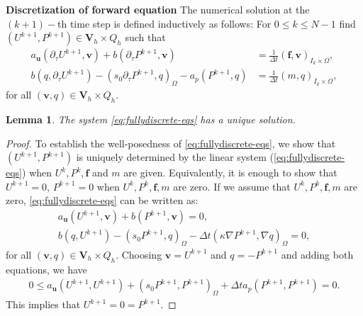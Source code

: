 \documentclass{amsart}
\newcommand{\ta}{\tau}
\newtheorem{lemma}[theorem]{Lemma}
\newcommand{\algn}[1]{\begin{align} #1 \end{align}}
\newcommand{\algns}[1]{\begin{align*} #1 \end{align*}}
\newcommand{\LRp}[1]{\left( #1 \right)}
\begin{document}
\medskip
{\bf Discretization of forward equation} The numerical solution at the $(k+1)-$th time step is defined inductively as follows: For $0\le k \le N-1$ find $(U^{k+1}, P^{k+1}) \in \boldsymbol{V}_h \times Q_h$ such that
%
\begin{subequations}\label{eq:fullydiscrete-eqs}
	\algn{
		\label{eq:fullydiscrete-eq1}
		a_{\boldsymbol{u}} \LRp{\partial_\ta U^{k+1}, \boldsymbol{v}} + b \LRp{\partial_\ta P^{k+1}, \boldsymbol{v}} &= \frac{1}{\Delta t} \LRp{{\boldsymbol{f}}, \boldsymbol{v}}_{I_k\times\Omega}, \\
		\label{eq:fullydiscrete-eq2}
		b \LRp{q, \partial_\ta U^{k+1}} - \LRp{s_0 \partial_\ta P^{k+1}, q}_{\Omega} - a_p\LRp{ P^{k+1}, q} &= \frac{1}{\Delta t}\LRp{m, q}_{I_k\times\Omega}, 
	}    
\end{subequations}
for all $\LRp{\boldsymbol{v}, q} \in \boldsymbol{V}_h \times Q_h$. 
%
\begin{lemma}
    The system \eqref{eq:fullydiscrete-eqs} has a unique solution.     
\end{lemma}
%
\begin{proof}
To establish the well-posedness of \eqref{eq:fullydiscrete-eqs}, we show that $(U^{k+1}, P^{k+1})$ is uniquely determined by the linear system (\ref{eq:fullydiscrete-eqs})  when $U^{k}, P^{k}, {\boldsymbol{f}}$ and $m$ are given. Equivalently, it is enough to show that $U^{k+1}=0$,  $P^{k+1}=0$ when $U^{k}, P^{k}, \boldsymbol{f}, m$ are zero. If we assume that $U^{k}, P^{k}, \boldsymbol{f}, m$ are zero, \eqref{eq:fullydiscrete-eqs} can be written as:
\begin{subequations}
	\algns{
		a_{\boldsymbol{u}} \LRp{U^{k+1}, \boldsymbol{v}} + b \LRp{P^{k+1}, \boldsymbol{v}} = 0,
		\\
		b \LRp{q, U^{k+1}} - \LRp{s_0 P^{k+1}, q}_{\Omega} - \Delta t\LRp{{\kappa} \nabla P^{k+1}, \nabla q}_{\Omega} = 0, 
	}    
\end{subequations}
%
for all $\LRp{\boldsymbol{v}, q} \in \boldsymbol{V}_h \times Q_h$. Choosing $ \boldsymbol{v}=U^{k+1}$ and $q=-P^{k+1}$ and adding both equations, we have
\begin{align*}
	0\le  a_{\boldsymbol{u}} \LRp{U^{k+1}, U^{k+1}}+  \LRp{s_0 P^{k+1}, P^{k+1}}_{\Omega} +\Delta t a_p\LRp{ P^{k+1}, P^{k+1}}=0.
\end{align*}
This implies that $U^{k+1}=0 = P^{k+1}$.    
\end{proof}

\end{document}
